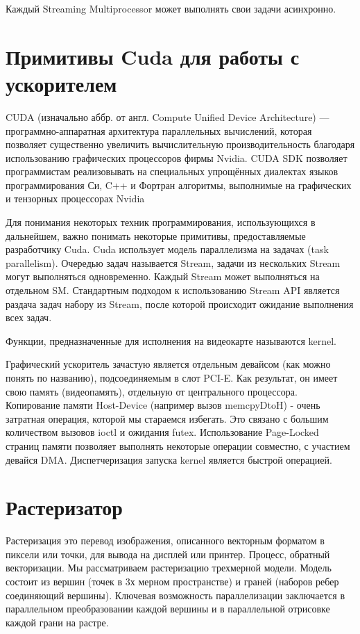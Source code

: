 Каждый Streaming Multiprocessor может выполнять свои задачи асинхронно.

\section{Примитивы Cuda для работы с ускорителем}

CUDA (изначально аббр. от англ. Compute Unified Device Architecture) — программно-аппаратная архитектура параллельных вычислений, которая позволяет существенно увеличить вычислительную производительность благодаря использованию графических процессоров фирмы Nvidia.
CUDA SDK позволяет программистам реализовывать на специальных упрощённых диалектах языков программирования Си, C++ и Фортран алгоритмы, выполнимые на графических и тензорных процессорах Nvidia

Для понимания некоторых техник программирования, использующихся в дальнейшем, важно понимать некоторые примитивы, предоставляемые разработчику Cuda.
Cuda использует модель параллелизма на задачах (task parallelism).
Очередью задач называется Stream, задачи из нескольких Stream могут выполняться одновременно. Каждый Stream может выполняться на отдельном SM. Стандартным подходом к использованию Stream API является раздача задач набору из Stream, после которой происходит ожидание выполнения всех задач.

Функции, предназначенные для исполнения на видеокарте называются kernel. 

Графический ускоритель зачастую является отдельным девайсом (как можно понять по названию), подсоединяемым в слот PCI-E. Как результат, он имеет свою память (видеопамять), отдельную от центрального процессора. 
Копирование памяти Host-Device (например вызов memcpyDtoH) - очень затратная операция, которой мы стараемся избегать. Это связано с большим количеством вызовов ioctl и ожидания futex. Использование Page-Locked страниц памяти позволяет выполнять некоторые операции совместно, с участием девайся DMA.
Диспетчеризация запуска kernel является быстрой операцией.

\section{Растеризатор}

Растеризация это перевод изображения, описанного векторным форматом в пиксели или точки, для вывода на дисплей или принтер. Процесс, обратный векторизации.
Мы рассматриваем растеризацию трехмерной модели. Модель состоит из вершин (точек в 3х мерном пространстве) и граней (наборов ребер соединяющий вершины).
Ключевая возможность параллелизации заключается в параллельном преобразовании каждой вершины и в параллельной отрисовке каждой грани на растре.

